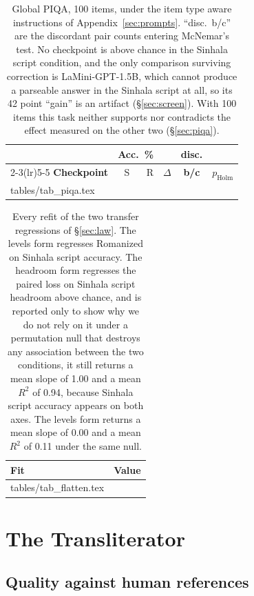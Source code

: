 \documentclass[11pt]{article}
\makeatletter
\newcommand{\rows}[1]{\@@input #1 }
\makeatother
\begin{document}
\begin{table}[t]
\centering\small
\setlength{\tabcolsep}{3.4pt}
\begin{tabular}{@{}lrrrcr@{}}
\toprule
& \multicolumn{2}{c}{Acc.\ \%} & & \textbf{disc.} & \\
\cmidrule(lr){2-3}\cmidrule(lr){5-5}
\textbf{Checkpoint} & S & R & \boldmath$\Delta$ & \textbf{b/c}
& \boldmath$p_{\text{Holm}}$ \\
\midrule
\rows{tables/tab_piqa.tex}
\bottomrule
\end{tabular}
\caption{Global PIQA, 100 items, under the item type aware instructions of
Appendix~\ref{sec:prompts}. ``disc.\ b/c'' are the discordant pair
counts entering McNemar's test. No checkpoint is above chance in the Sinhala script
condition, and the only comparison surviving correction is LaMini-GPT-1.5B, which
cannot produce a parseable answer in the Sinhala script at all, so its 42 point
``gain'' is an artifact (\S\ref{sec:screen}). With 100 items this task neither
supports nor contradicts the effect measured on the other two (\S\ref{sec:piqa}).}
\label{tab:piqa}
\end{table}

\begin{table}[t]
\centering\scriptsize
\setlength{\tabcolsep}{2pt}
\begin{tabular}{@{}lr@{}}
\toprule
\textbf{Fit} & \textbf{Value} \\
\midrule
\rows{tables/tab_flatten.tex}
\bottomrule
\end{tabular}
\caption{Every refit of the two transfer regressions of \S\ref{sec:law}. The
levels form regresses Romanized on Sinhala script accuracy. The headroom form
regresses the paired loss on Sinhala script headroom above chance, and is reported
only to show why we do not rely on it under a permutation null that destroys any
association between the two conditions, it still returns a mean slope of 1.00 and
a mean $R^2$ of 0.94, because Sinhala script accuracy appears on both axes. The
levels form returns a mean slope of 0.00 and a mean $R^2$ of 0.11 under the same
null.}
\label{tab:flatten}
\end{table}


\section{The Transliterator}
\label{sec:translitdetail}

\subsection{Quality against human references}
\label{sec:QulHum}
\end{document}

